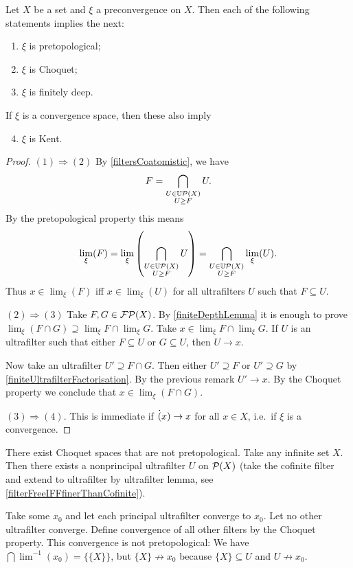 \begin{proposition}
Let $X$ be a set and $\xi$ a preconvergence on $X$. Then each of the following statements implies the next:
\begin{enumerate}
\item $\xi$ is pretopological;
\item $\xi$ is Choquet;
\item $\xi$ is finitely deep.
\end{enumerate}
If $\xi$ is a convergence space, then these also imply
\begin{enumerate} \setcounter{enumi}{3}
\item $\xi$ is Kent.
\end{enumerate}
\end{proposition}
\begin{proof}
$(1) \Rightarrow (2)$ By \ref{filtersCoatomistic}, we have
\[ F = \bigcap_{\substack{U\in \operatorname{\mathbb{U}\mathcal{P}}(X) \\ U\geq F}} U. \]
By the pretopological property this means
\[ \lim_\xi(F) = \lim_\xi\left(\bigcap_{\substack{U\in \operatorname{\mathbb{U}\mathcal{P}}(X) \\ U\geq F}} U\right) = \bigcap_{\substack{U\in \operatorname{\mathbb{U}\mathcal{P}}(X) \\ U\geq F}} \lim_\xi(U). \]
Thus $x\in \lim_\xi(F)$ iff $x\in \lim_\xi(U)$ for all ultrafilters $U$ such that $F\subseteq U$.

$(2) \Rightarrow (3)$ Take $F,G\in\operatorname{\mathcal{FP}}(X)$. By \ref{finiteDepthLemma} it is enough to prove $\lim_\xi(F\cap G) \supseteq \lim_\xi F \cap \lim_\xi G$. Take $x\in \lim_\xi F \cap \lim_\xi G$. If $U$ is an ultrafilter such that either $F\subseteq U$ or $G\subseteq U$, then $U\to x$.

Now take an ultrafilter $U' \supseteq F\cap G$. Then either $U'\supseteq F$ or $U'\supseteq G$ by \ref{finiteUltrafilterFactorisation}. By the previous remark $U'\to x$. By the Choquet property we conclude that $x\in \lim_\xi(F\cap G)$.

$(3) \Rightarrow (4)$. This is immediate if $\dot(x) \to x$ for all $x\in X$, i.e.\ if $\xi$ is a convergence.
\end{proof}

\begin{example}
There exist Choquet spaces that are not pretopological. Take any infinite set $X$. Then there exists a nonprincipal ultrafilter $U$ on $\operatorname{\mathcal{P}}(X)$ (take the cofinite filter and extend to ultrafilter by ultrafilter lemma, see \ref{filterFreeIFFfinerThanCofinite}).

Take some $x_0$ and let each principal ultrafilter converge to $x_0$. Let no other ultrafilter converge. Define convergence of all other filters by the Choquet property. This convergence is not pretopological: We have $\bigcap \lim^{-1}(x_0) = \big\{\{X\}\big\}$, but $\{X\} \not\to x_0$ because $\{X\}\subseteq U$ and $U \not\to x_0$.
\end{example}

